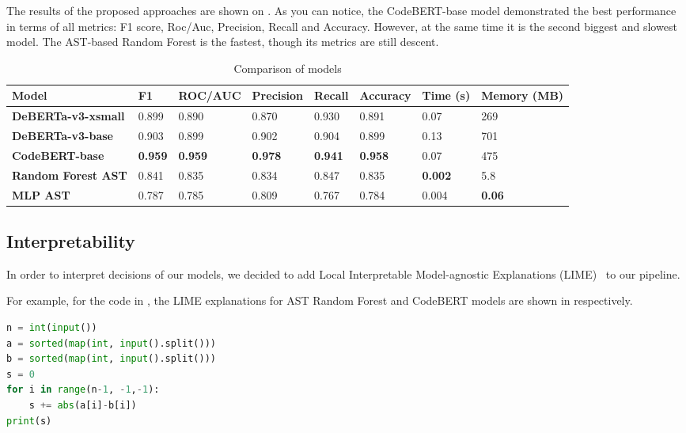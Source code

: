 \documentclass{article}
\begin{document}
The results of the proposed approaches are shown on . As you can notice, the CodeBERT-base model demonstrated the best performance in terms of all metrics: F1 score, Roc/Auc, Precision, Recall and Accuracy. However, at the same time it is the second biggest and slowest model. The AST-based Random Forest is the fastest, though its metrics are still descent.
\begin{table}[ht!]
  \small
  \centering
  \caption{Comparison of models}\label{tab:model_comparison}
  \begin{tabular}{llllllll}
    \toprule
    Model                      & {F1}           & {ROC/AUC}      & {Precision}    & {Recall}       & {Accuracy}     & {Time (s)}     & {Memory (MB)} \\
    \midrule
    \textbf{DeBERTa-v3-xsmall} & 0.899          & 0.890          & 0.870          & 0.930          & 0.891          & 0.07           & 269           \\
    \textbf{DeBERTa-v3-base}   & 0.903          & 0.899          & 0.902          & 0.904          & 0.899          & 0.13           & 701           \\
    \textbf{CodeBERT-base}     & \textbf{0.959} & \textbf{0.959} & \textbf{0.978} & \textbf{0.941} & \textbf{0.958} & 0.07           & 475           \\
    \textbf{Random Forest AST} & 0.841          & 0.835          & 0.834          & 0.847          & 0.835          & \textbf{0.002} & 5.8           \\
    \textbf{MLP AST}           & 0.787          & 0.785          & 0.809          & 0.767          & 0.784          & 0.004          & \textbf{0.06} \\
    \bottomrule
  \end{tabular}
\end{table}

\subsection{Interpretability}

In order to interpret decisions of our models, we decided to add Local Interpretable Model-agnostic Explanations (LIME)~\cite{Ribeiro16} to our pipeline.

For example, for the code in , the LIME explanations for AST Random Forest and CodeBERT models are shown in  respectively.

\begin{lstlisting}[language=Python,frame=single,caption=Python code snippet,label=lst:code_lime]
n = int(input())
a = sorted(map(int, input().split()))
b = sorted(map(int, input().split()))
s = 0
for i in range(n-1, -1,-1):
    s += abs(a[i]-b[i])
print(s)
\end{lstlisting}
\end{document}
